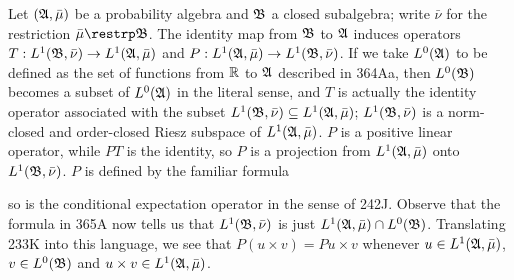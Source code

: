  Let $(\frak A,\bar\mu)$ be a probability algebra
and $\frak B$ a closed subalgebra;  write $\bar\nu$ for the restriction
$\bar\mu\restrp\frak B$.   The identity map from $\frak B$ to $\frak A$
induces operators $T:L^1(\frak B,\bar\nu)\to L^1(\frak A,\bar\mu)$ and
$P:L^1(\frak A,\bar\mu)\to L^1(\frak B,\bar\nu)$.   If we take
$L^0(\frak A)$ to be
defined as the set of functions from $\Bbb R$ to $\frak A$ described in
364Aa, then $L^0(\frak B)$
becomes a subset of $L^0(\frak A)$ in the literal sense, and $T$ is
actually the identity operator associated with the subset
$L^1(\frak B,\bar\nu)\subseteq L^1(\frak A,\bar\mu)$;
$L^1(\frak B,\bar\nu)$ is a
norm-closed and order-closed Riesz subspace of $L^1(\frak A,\bar\mu)$.
$P$ is a positive linear operator, while $PT$ is the identity, so $P$ is
a projection from $L^1(\frak A,\bar\mu)$ onto $L^1(\frak B,\bar\nu)$.
$P$ is defined by the familiar formula
     
     
\noindent so is the conditional expectation operator in the sense of
242J.   
Observe that the formula in 365A now tells us that
$L^1(\frak B,\bar\nu)$ is just $L^1(\frak A,\bar\mu)\cap L^0(\frak B)$.
Translating 233K into this language, we see that
$P(u\times v)=Pu\times v$ whenever $u\in L^1(\frak A,\bar\mu)$,
$v\in L^0(\frak B)$ and $u\times v\in L^1(\frak A,\bar\mu)$.

